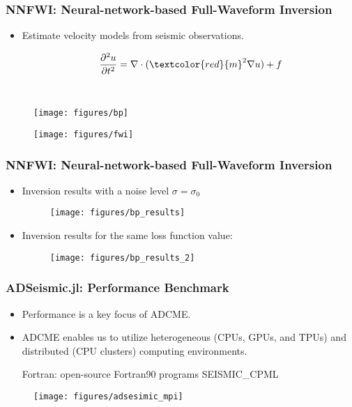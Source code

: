 \documentclass[usenames,dvipsnames]{beamer}
\begin{document}
\begin{frame}
	\frametitle{NNFWI: Neural-network-based Full-Waveform Inversion}
	
	\begin{itemize}
		\item Estimate velocity models from seismic observations. 
	\end{itemize}
	\begin{minipage}[t]{0.3\textwidth}
		\begin{equation*}
			\qquad\frac{\partial^2 u}{\partial t^2} = \nabla \cdot (\textcolor{red}{m}^2 \nabla u) + f
		\end{equation*}
	\end{minipage}~
	\begin{minipage}[t]{0.69\textwidth}
		\begin{figure}[hbt]
			\centering
			\texttt{[image: figures/bp]}
		\end{figure}
	\end{minipage}
	
	
	
	\begin{figure}[hbt]
		\texttt{[image: figures/fwi]}
	\end{figure}
\end{frame}

\begin{frame}
	\frametitle{NNFWI: Neural-network-based Full-Waveform Inversion}
	
	\begin{itemize}
		\item Inversion results with a noise level $\sigma = \sigma_0$
		\begin{figure}[hbt]
			\centering
			\texttt{[image: figures/bp\_results]}
		\end{figure}
		
		\item Inversion results for the same loss function value:
		\begin{figure}[hbt]
			\centering
			\texttt{[image: figures/bp\_results\_2]}
		\end{figure}
		
	\end{itemize}
	
\end{frame}

\begin{frame}
	\frametitle{ADSeismic.jl: Performance Benchmark}
	\begin{itemize}
		\item Performance is a key focus of ADCME.  
		\item ADCME enables us to utilize heterogeneous (CPUs, GPUs, and TPUs) and distributed (CPU clusters) computing environments.
		
		{\small Fortran: {open-source Fortran90 programs SEISMIC\_CPML}}
	\end{itemize}
	\begin{figure}[hbt]
		\texttt{[image: figures/adsesimic\_mpi]}
	\end{figure}
\end{frame}
\end{document}

